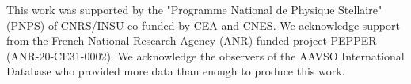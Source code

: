 \documentclass{aa}
\begin{document}




\begin{acknowledgements}
    This work was supported by the "Programme National de Physique Stellaire" (PNPS) of CNRS/INSU co-funded by CEA and CNES.
    We acknowledge support from the French National Research Agency (ANR)
    funded project PEPPER (ANR-20-CE31-0002).
    We acknowledge the observers of the AAVSO International Database who provided more data than enough to produce this work.
    
    \end{acknowledgements}
    
    
    
    
\end{document}
